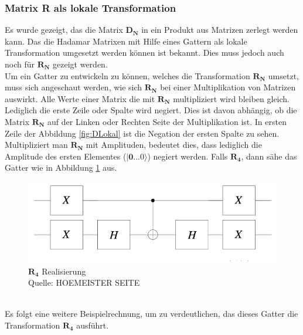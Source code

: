 \subsubsection{Matrix R als lokale Transformation}
Es wurde gezeigt, das die Matrix $\mathbf{D_N}$ in ein Produkt aus Matrizen zerlegt werden kann. Das die Hadamar Matrixen mit Hilfe eines Gattern als lokale Transformation umgesetzt werden können ist bekannt. Dies muss jedoch auch noch für $\mathbf{R_N}$ gezeigt werden. 
\\
Um ein Gatter zu entwickeln zu können, welches die Transformation $\mathbf{R_N}$ umsetzt, muss sich angeschaut werden, wie sich $\mathbf{R_N}$ bei einer Multiplikation von Matrizen auswirkt. Alle Werte einer Matrix die mit $\mathbf{R_N}$ multipliziert wird bleiben gleich. Lediglich die erste Zeile oder Spalte wird negiert. Dies ist davon abhängig, ob die Matrix $\mathbf{R_N}$ auf der Linken oder Rechten Seite der Multiplikation ist. In ersten Zeile der Abbildung \ref{fig:DLokal} ist die Negation der ersten Spalte zu sehen.
\\
Multipliziert man $\mathbf{R_N}$ mit Amplituden, bedeutet dies, dass lediglich die Amplitude des ersten Elementes ($\mathbf{|0...0\rangle}$) negiert werden.
Falls $\mathbf{R_4}$, dann sähe das Gatter wie in Abbildung \ref{fig:Rgatter} aus.
 \begin{figure}[hbtp]
 	\centering
 	\includegraphics[width=.8\textwidth]{figures/rgatter.png}
 	\caption{$\mathbf{R_4}$ Realisierung \\ Quelle: HOEMEISTER SEITE}
 	\label{fig:Rgatter}
 \end{figure}
\\
Es folgt eine weitere Beispielrechnung, um zu verdeutlichen, das dieses Gatter die Transformation $\mathbf{R_4}$ ausführt.
